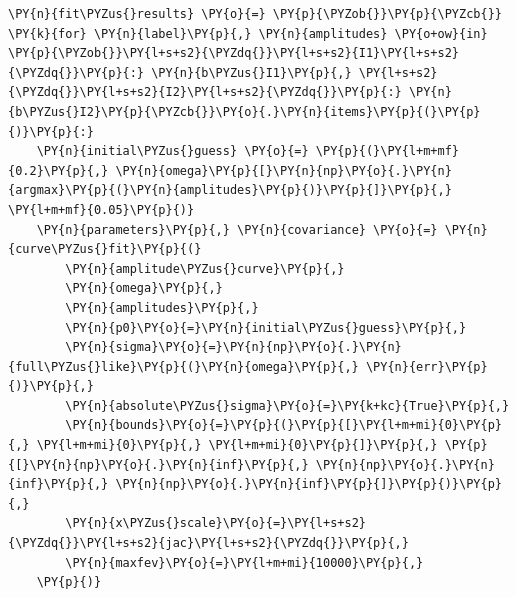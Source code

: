 \begin{tcolorbox}[breakable, size=fbox, boxrule=1pt, pad at break*=1mm,colback=cellbackground, colframe=cellborder]
\begin{Verbatim}[commandchars=\\\{\}]
\PY{n}{fit\PYZus{}results} \PY{o}{=} \PY{p}{\PYZob{}}\PY{p}{\PYZcb{}}
\PY{k}{for} \PY{n}{label}\PY{p}{,} \PY{n}{amplitudes} \PY{o+ow}{in} \PY{p}{\PYZob{}}\PY{l+s+s2}{\PYZdq{}}\PY{l+s+s2}{I1}\PY{l+s+s2}{\PYZdq{}}\PY{p}{:} \PY{n}{b\PYZus{}I1}\PY{p}{,} \PY{l+s+s2}{\PYZdq{}}\PY{l+s+s2}{I2}\PY{l+s+s2}{\PYZdq{}}\PY{p}{:} \PY{n}{b\PYZus{}I2}\PY{p}{\PYZcb{}}\PY{o}{.}\PY{n}{items}\PY{p}{(}\PY{p}{)}\PY{p}{:}
    \PY{n}{initial\PYZus{}guess} \PY{o}{=} \PY{p}{(}\PY{l+m+mf}{0.2}\PY{p}{,} \PY{n}{omega}\PY{p}{[}\PY{n}{np}\PY{o}{.}\PY{n}{argmax}\PY{p}{(}\PY{n}{amplitudes}\PY{p}{)}\PY{p}{]}\PY{p}{,} \PY{l+m+mf}{0.05}\PY{p}{)}
    \PY{n}{parameters}\PY{p}{,} \PY{n}{covariance} \PY{o}{=} \PY{n}{curve\PYZus{}fit}\PY{p}{(}
        \PY{n}{amplitude\PYZus{}curve}\PY{p}{,}
        \PY{n}{omega}\PY{p}{,}
        \PY{n}{amplitudes}\PY{p}{,}
        \PY{n}{p0}\PY{o}{=}\PY{n}{initial\PYZus{}guess}\PY{p}{,}
        \PY{n}{sigma}\PY{o}{=}\PY{n}{np}\PY{o}{.}\PY{n}{full\PYZus{}like}\PY{p}{(}\PY{n}{omega}\PY{p}{,} \PY{n}{err}\PY{p}{)}\PY{p}{,}
        \PY{n}{absolute\PYZus{}sigma}\PY{o}{=}\PY{k+kc}{True}\PY{p}{,}
        \PY{n}{bounds}\PY{o}{=}\PY{p}{(}\PY{p}{[}\PY{l+m+mi}{0}\PY{p}{,} \PY{l+m+mi}{0}\PY{p}{,} \PY{l+m+mi}{0}\PY{p}{]}\PY{p}{,} \PY{p}{[}\PY{n}{np}\PY{o}{.}\PY{n}{inf}\PY{p}{,} \PY{n}{np}\PY{o}{.}\PY{n}{inf}\PY{p}{,} \PY{n}{np}\PY{o}{.}\PY{n}{inf}\PY{p}{]}\PY{p}{)}\PY{p}{,}
        \PY{n}{x\PYZus{}scale}\PY{o}{=}\PY{l+s+s2}{\PYZdq{}}\PY{l+s+s2}{jac}\PY{l+s+s2}{\PYZdq{}}\PY{p}{,}
        \PY{n}{maxfev}\PY{o}{=}\PY{l+m+mi}{10000}\PY{p}{,}
    \PY{p}{)}
    

\end{Verbatim}
\end{tcolorbox}
